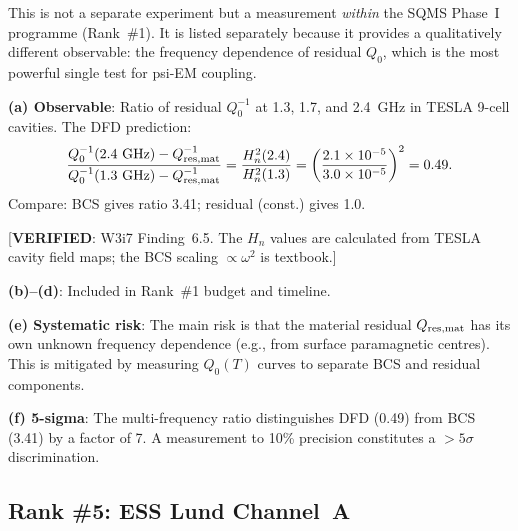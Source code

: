 \documentclass[11pt]{article}
\newcommand{\ee}[1]{\times 10^{#1}}
\newcommand{\Heff}{H_n}
\theoremstyle{definition}
\theoremstyle{remark}
\begin{document}
\begin{tcolorbox}[colback=yellow!5!white, colframe=yellow!60!black,
  title=\textbf{RANK \#4: SQMS MULTI-FREQUENCY $Q_0$ RATIO DIAGNOSTIC}]

This is not a separate experiment but a measurement \emph{within}
the SQMS Phase~I programme (Rank~\#1). It is listed separately because
it provides a qualitatively different observable: the frequency
dependence of residual $Q_0$, which is the most powerful single test
for psi-EM coupling.

\textbf{(a) Observable}: Ratio of residual $Q_0^{-1}$ at 1.3, 1.7,
and 2.4~GHz in TESLA 9-cell cavities. The DFD prediction:
\begin{equation}
\frac{Q_0^{-1}(2.4~\text{GHz}) - Q_{\rm res,mat}^{-1}}{Q_0^{-1}(1.3~\text{GHz}) - Q_{\rm res,mat}^{-1}} = \frac{\Heff^2(2.4)}{
\Heff^2(1.3)} = \left(\frac{2.1\ee{-5}}{3.0\ee{-5}}\right)^2 = 0.49.
\end{equation}
Compare: BCS gives ratio 3.41; residual (const.) gives 1.0.

[\textbf{VERIFIED}: W3i7 Finding~6.5. The $\Heff$ values are calculated
from TESLA cavity field maps; the BCS scaling $\propto \omega^2$ is
textbook.]

\textbf{(b)--(d)}: Included in Rank~\#1 budget and timeline.

\textbf{(e) Systematic risk}: The main risk is that the material
residual $Q_{\rm res,mat}$ has its own unknown frequency dependence
(e.g., from surface paramagnetic centres). This is mitigated by
measuring $Q_0(T)$ curves to separate BCS and residual components.

\textbf{(f) 5-sigma}: The multi-frequency ratio distinguishes DFD
(0.49) from BCS (3.41) by a factor of 7. A measurement to 10\%
precision constitutes a $>5\sigma$ discrimination.

\end{tcolorbox}


\subsection{Rank \#5: ESS Lund Channel~A}
\label{ssec:rank5}
\end{document}
